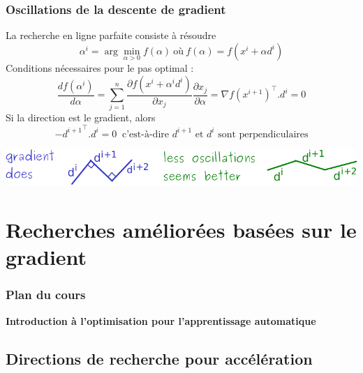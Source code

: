 \documentclass[12pt]{beamer}
\begin{document}
\begin{frame}
\frametitle{Oscillations de la descente de gradient} 
La recherche en ligne parfaite consiste à résoudre
\begin{equation*}
\alpha^i = \arg\min_{\alpha>0} f(\alpha) ~\text{où}~ f(\alpha) = f(x^i + \alpha d^i) 
\end{equation*}
Conditions nécessaires pour le pas optimal : 
\begin{equation*}
\frac{df(\alpha^i)}{d\alpha} = \sum_{j=1}^n \frac{\partial f(x^i + \alpha^i d^i)}{\partial x_j} \frac{\partial x_j}{\partial \alpha}
= \nabla f(x^{i+1})^\top . d^i = 0
\end{equation*}
Si la direction est le gradient, alors
\begin{equation*}
-{d^{i+1}}^\top . d^i = 0 ~\text{ c’est-à-dire } d^{i+1} \text{ et } d^i \text{ sont perpendiculaires}
\end{equation*}
\begin{center}
\includegraphics[width=\textwidth]{oscillations-crop.pdf} 
\end{center}
\end{frame}

\section{Recherches améliorées basées sur le gradient}

\begin{frame}%
\frametitle{Plan du cours} 
\begin{multicols}{2}
\begin{center} \textbf{Introduction à l’optimisation pour l’apprentissage automatique} \end{center}
\tableofcontents[currentsection]
\end{multicols}
\end{frame}


\subsection{Directions de recherche pour accélération}
\end{document}
